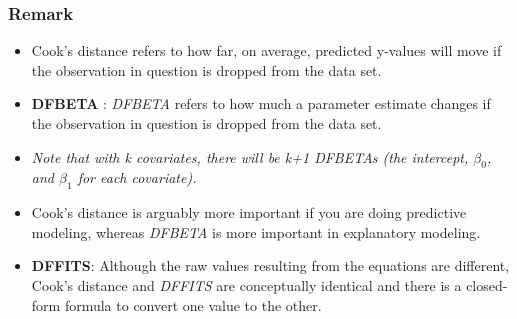 \documentclass[residuals.tex]{subfiles}
\begin{document}
\newpage	

\subsubsection*{Remark}	

\begin{itemize}
\item Cook's distance refers to how far, on average, predicted y-values will move if the observation in question is dropped from the data set. 
\item \textbf{DFBETA} :  \textit{DFBETA} refers to how much a parameter estimate changes if the observation in question is dropped from the data set.

\item  \textit{Note that with k covariates, there will be k+1 DFBETAs (the intercept, $\beta_0$, and $\beta_1$ for each covariate).}
\item  Cook's distance is arguably more important if you are doing predictive modeling, whereas \textit{DFBETA} is more important in explanatory modeling.
\item \textbf{DFFITS}: Although the raw values resulting from the equations are different, Cook's distance and \textit{DFFITS} are conceptually identical and there is a closed-form formula to convert one value to the other.
\end{itemize}



\end{document}
